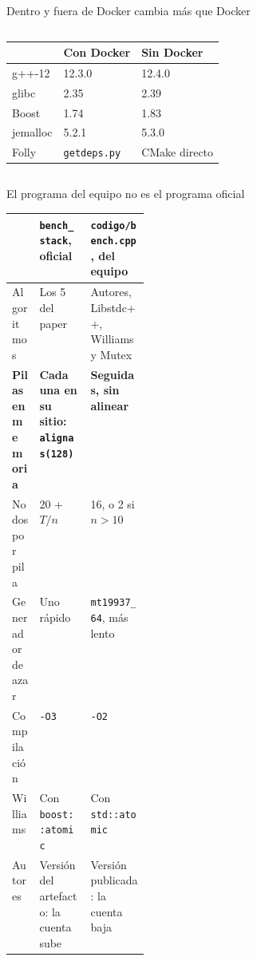\begin{frame}{Dentro y fuera de Docker cambia más que Docker}
  \begin{columns}[T]
    \small\renewcommand{\arraystretch}{1.15}
    \begin{tabular}{@{}lll@{}}
      \toprule
      & \textbf{Con Docker} & \textbf{Sin Docker}\\
      \midrule
      g++-12 & 12.3.0 & 12.4.0\\
      glibc & 2.35 & 2.39\\
      Boost & 1.74 & 1.83\\
      jemalloc & 5.2.1 & 5.3.0\\
      Folly & \texttt{getdeps.py} & CMake directo\\
      \bottomrule
    \end{tabular}
    \par\medskip
  \end{columns}
  \vfill
\end{frame}

\begin{frame}{El programa del equipo no es el programa oficial}
  \footnotesize\renewcommand{\arraystretch}{1.15}
  \begin{tabularx}{\linewidth}{@{}>{\leavevmode\color{gris}}p{0.2\linewidth}XX@{}}
    \toprule
    & \textbf{\texttt{bench\_stack}, oficial} & \textbf{\texttt{codigo/bench.cpp}, del equipo}\\
    \midrule
    Algoritmos & Los 5 del paper & Autores, Libstdc++, Williams y Mutex\\
    \rowcolor{ambarsuave}\color{tinta}\bfseries Pilas en memoria & \textbf{Cada una en su sitio: \texttt{alignas(128)}} & \textbf{Seguidas, sin alinear}\\
    Nodos por pila & 20 + $T/n$ & 16, o 2 si $n > 10$\\
    Generador de azar & Uno rápido & \texttt{mt19937\_64}, más lento\\
    Compilación & \texttt{-O3} & \texttt{-O2}\\
    Williams & Con \texttt{boost::atomic} & Con \texttt{std::atomic}\\
    Autores & Versión del artefacto: la cuenta sube & Versión publicada: la cuenta baja\\
    \bottomrule
  \end{tabularx}
  \vfill
\end{frame}

